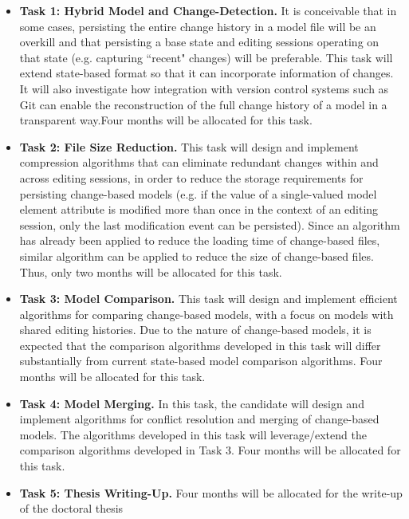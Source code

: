 \documentclass[12pt, a4paper]{report} \usepackage[titletoc]{appendix}
\begin{document}
\begin{itemize}
	\item \textbf{Task 1: Hybrid Model and Change-Detection.} It is conceivable that in some cases, persisting the entire change history in a model file will be an overkill and that persisting a base state and editing sessions operating on that state (e.g. capturing ``recent" changes) will be preferable. This task will extend state-based format so that it can incorporate information of changes. It will also investigate how integration with version control systems such as Git can enable the reconstruction of the full change history of a model in a transparent way.Four months will be allocated for this task. 
	\item \textbf{Task 2: File Size Reduction.} This task will design and implement compression algorithms that can eliminate redundant changes within and across editing sessions, in order to reduce the storage requirements for persisting change-based models (e.g. if the value of a single-valued model element attribute is modiﬁed more than once in the context of an editing session, only the last modiﬁcation event can be persisted). Since an algorithm has already been applied to reduce the loading time of change-based files, similar algorithm can be applied to reduce the size of change-based files. Thus, only two months will be allocated for this task.
	\item \textbf{Task 3: Model Comparison.} This task will design and implement efﬁcient algorithms for comparing change-based models, with a focus on models with shared editing histories. Due to the nature of change-based models, it is expected that the comparison algorithms developed in this task will differ substantially from current state-based model comparison algorithms. Four months will be allocated for this task. 
	\item \textbf{Task 4: Model Merging.} In this task, the candidate will design and implement algorithms for conflict resolution and merging of change-based models. The algorithms developed in this task will leverage/extend the comparison algorithms developed in Task 3. Four months will be allocated for this task. 
	\item \textbf{Task 5: Thesis Writing-Up.} Four months will be allocated for the write-up of the doctoral thesis  
\end{itemize}
\end{document}
